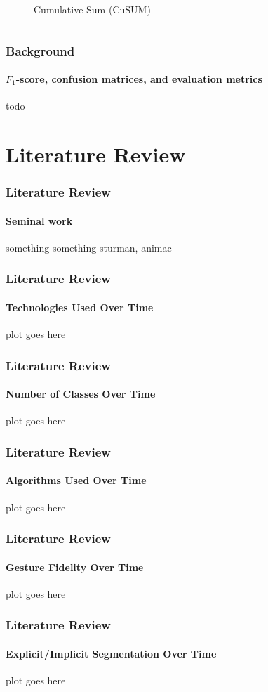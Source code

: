 \documentclass[xcolor={svgnames,table},10pt,fleqn]{beamer}
\begin{document}
\begin{frame}
\begin{columns}
\begin{column}{.5\textwidth}
\begin{figure}
                \caption{Cumulative Sum (CuSUM)}
            \end{figure}
        \end{column}
    \end{columns}
\end{frame}

\begin{frame}
    \frametitle{Background}
    \framesubtitle{$F_1$-score, confusion matrices, and evaluation metrics}
    todo
\end{frame}

\section{Literature Review}
\begin{frame}
    \frametitle{Literature Review}
    \framesubtitle{Seminal work}
    something something sturman, animac
\end{frame}

\begin{frame}
    \frametitle{Literature Review}
    \framesubtitle{Technologies Used Over Time}
    plot goes here
\end{frame}

\begin{frame}
    \frametitle{Literature Review}
    \framesubtitle{Number of Classes Over Time}
    plot goes here
\end{frame}

\begin{frame}
    \frametitle{Literature Review}
    \framesubtitle{Algorithms Used Over Time}
    plot goes here
\end{frame}

\begin{frame}
    \frametitle{Literature Review}
    \framesubtitle{Gesture Fidelity Over Time}
    plot goes here
\end{frame}

\begin{frame}
    \frametitle{Literature Review}
    \framesubtitle{Explicit/Implicit Segmentation Over Time}
    plot goes here
\end{frame}
\end{document}
